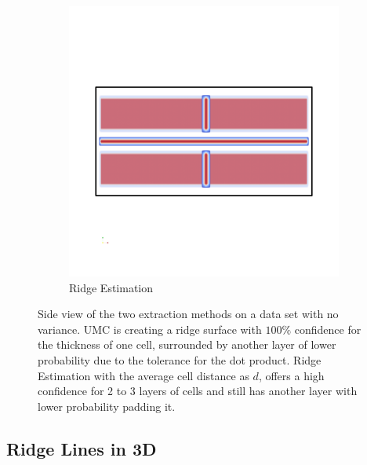 \begin{figure}
\begin{subfigure}{0.49\textwidth}
        \includegraphics[trim=0 450 0 450, clip=true, width=\textwidth]{Images/newSide.png}
        \caption{Ridge Estimation}
        \label{fig:REside}
    \end{subfigure}
    \caption{Side view of the two extraction methods on a data set with
    no variance.  UMC is creating a ridge surface
    with $100\%$ confidence for the thickness of one cell, surrounded by
    another layer of lower probability due to the tolerance for the dot
    product.  Ridge Estimation with the average cell
    distance as $d$, offers a high confidence for 2 to 3 layers of cells
    and still has another layer with lower probability padding it.}
\end{figure}


\subsection{Ridge Lines in 3D}\label{sec:evalRL}

